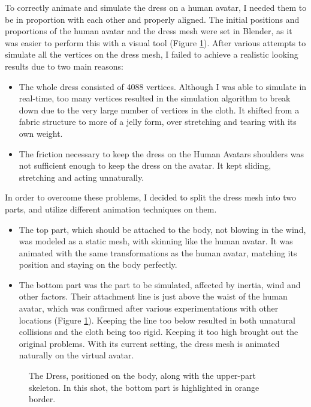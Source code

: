 To correctly animate and simulate the dress on a human avatar, I needed them to be in proportion with each other and properly aligned. The initial positions and proportions of the human avatar and the dress mesh were set in Blender, as it was easier to perform this with a visual tool (Figure \ref{fig:dress_with_body}).
After various attempts to simulate all the vertices on the dress mesh, I failed to achieve a realistic looking results due to two main reasons:
\begin{itemize}
  \item The whole dress consisted of 4088 vertices. Although I was able to simulate in real-time, too many vertices resulted in the simulation algorithm to break down due to the very large number of vertices in the cloth. It shifted from a fabric structure to more of a jelly form, over stretching and tearing with its own weight.
  \item The friction necessary to keep the dress on the Human Avatars shoulders was not sufficient enough to keep the dress on the avatar. It kept sliding, stretching and acting unnaturally.
\end{itemize}

In order to overcome these problems, I decided to split the dress mesh into two parts, and utilize different animation techniques on them.

\begin{itemize}
  \item The top part, which should be attached to the body, not blowing in the wind, was modeled as a static mesh, with skinning like the human avatar. It was animated with the same transformations as the human avatar, matching its position and staying on the body perfectly.
  \item The bottom part was the part to be simulated, affected by inertia, wind and other factors. Their attachment line is just above the waist of the human avatar, which was confirmed after various experimentations with other locations (Figure \ref{fig:dress_with_body}). Keeping the line too below resulted in both unnatural collisions and the cloth being too rigid. Keeping it too high brought out the original problems. With its current setting, the dress mesh is animated naturally on the virtual avatar.
\end{itemize}

\begin{figure}[h]
\centerline{}
\caption{The  Dress, positioned on the body, along with the upper-part skeleton. In this shot, the bottom part is highlighted in orange border.}
\label{fig:dress_with_body}
\end{figure}

